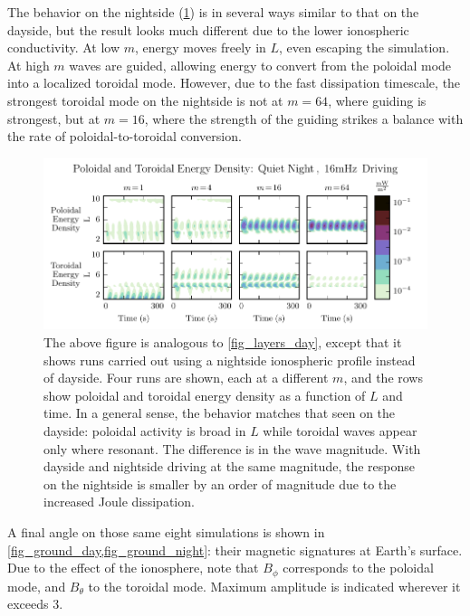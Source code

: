 \documentclass[draft,linenumbers]{agujournal}
\begin{document}
The behavior on the nightside (\cref{fig_layers_night}) is in several ways similar to that on the dayside, but the result looks much different due to the lower ionospheric conductivity. At low $m$, energy moves freely in $L$, even escaping the simulation. At high $m$ waves are guided, allowing energy to convert from the poloidal mode into a localized toroidal mode. However, due to the fast dissipation timescale, the strongest toroidal mode on the nightside is not at $m = 64$, where guiding is strongest, but at $m = 16$, where the strength of the guiding strikes a balance with the rate of poloidal-to-toroidal conversion.

\begin{figure}
    \begin{center}
    \includegraphics[width=\textwidth]{figures/fig_layers_night.pdf}
    \caption{
        The above figure is analogous to \cref{fig_layers_day}, except that it shows runs carried out using a nightside ionospheric profile instead of dayside. Four runs are shown, each at a different $m$, and the rows show poloidal and toroidal energy density as a function of $L$ and time. In a general sense, the behavior matches that seen on the dayside: poloidal activity is broad in $L$ while toroidal waves appear only where resonant. The difference is in the wave magnitude. With dayside and nightside driving at the same magnitude, the response on the nightside is smaller by an order of magnitude due to the increased Joule dissipation.
    }
    \label{fig_layers_night}
    \end{center}
\end{figure}

A final angle on those same eight simulations is shown in \cref{fig_ground_day,fig_ground_night}: their magnetic signatures at Earth's surface. Due to the effect of the ionosphere, note that $B_\phi$ corresponds to the poloidal mode, and $B_\theta$ to the toroidal mode. Maximum amplitude is indicated wherever it exceeds \SI{3}{\nT}.
\end{document}
